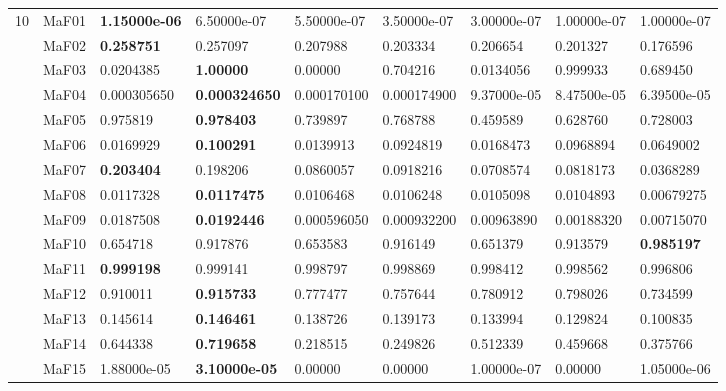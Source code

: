 \documentclass[]{article}
\begin{document}
\begin{landscape}
\begin{table}
\begin{footnotesize}
\begin{tabular}{|l|l|l|l|l|l|l|l|l|}
\multirow{15}{*}{10} & MaF01 & \cellcolor{gray95} {\bf 1.15000e-06} & \cellcolor{gray95} 6.50000e-07 & \cellcolor{gray95} 5.50000e-07 & \cellcolor{gray95} 3.50000e-07 & \cellcolor{gray95} 3.00000e-07 & 1.00000e-07 & 1.00000e-07\\
 & MaF02 & \cellcolor{gray95} {\bf 0.258751} & \cellcolor{gray95} 0.257097 & 0.207988 & 0.203334 & 0.206654 & 0.201327 & 0.176596\\
 & MaF03 & 0.0204385 & \cellcolor{gray95} {\bf 1.00000} & 0.00000 & 0.704216 & 0.0134056 & \cellcolor{gray95} 0.999933 & 0.689450\\
 & MaF04 & \cellcolor{gray95} 0.000305650 & \cellcolor{gray95} {\bf 0.000324650} & 0.000170100 & 0.000174900 & 9.37000e-05 & 8.47500e-05 & 6.39500e-05\\
 & MaF05 & \cellcolor{gray95} 0.975819 & \cellcolor{gray95} {\bf 0.978403} & 0.739897 & 0.768788 & 0.459589 & 0.628760 & 0.728003\\
 & MaF06 & 0.0169929 & \cellcolor{gray95} {\bf 0.100291} & 0.0139913 & 0.0924819 & 0.0168473 & \cellcolor{gray95} 0.0968894 & 0.0649002\\
 & MaF07 & \cellcolor{gray95} {\bf 0.203404} & \cellcolor{gray95} 0.198206 & 0.0860057 & 0.0918216 & 0.0708574 & 0.0818173 & 0.0368289\\
 & MaF08 & \cellcolor{gray95} 0.0117328 & \cellcolor{gray95} {\bf 0.0117475} & 0.0106468 & 0.0106248 & 0.0105098 & 0.0104893 & 0.00679275\\
 & MaF09 & \cellcolor{gray95} 0.0187508 & \cellcolor{gray95} {\bf 0.0192446} & 0.000596050 & 0.000932200 & 0.00963890 & 0.00188320 & 0.00715070\\
 & MaF10 & 0.654718 & \cellcolor{gray95} 0.917876 & 0.653583 & \cellcolor{gray95} 0.916149 & 0.651379 & \cellcolor{gray95} 0.913579 & \cellcolor{gray95} {\bf 0.985197}\\
 & MaF11 & \cellcolor{gray95} {\bf 0.999198} & \cellcolor{gray95} 0.999141 & \cellcolor{gray95} 0.998797 & \cellcolor{gray95} 0.998869 & 0.998412 & 0.998562 & 0.996806\\
 & MaF12 & \cellcolor{gray95} 0.910011 & \cellcolor{gray95} {\bf 0.915733} & 0.777477 & 0.757644 & 0.780912 & 0.798026 & 0.734599\\
 & MaF13 & \cellcolor{gray95} 0.145614 & \cellcolor{gray95} {\bf 0.146461} & 0.138726 & 0.139173 & 0.133994 & 0.129824 & 0.100835\\
 & MaF14 & \cellcolor{gray95} 0.644338 & \cellcolor{gray95} {\bf 0.719658} & 0.218515 & 0.249826 & 0.512339 & 0.459668 & 0.375766\\
 & MaF15 & \cellcolor{gray95} 1.88000e-05 & \cellcolor{gray95} {\bf 3.10000e-05} & 0.00000 & 0.00000 & 1.00000e-07 & 0.00000 & 1.05000e-06\\
\hline


\end{tabular}
\end{footnotesize}
\end{table}
\end{landscape}
\end{document}
